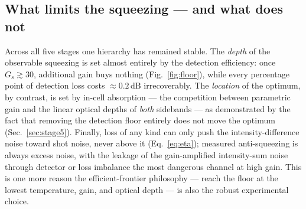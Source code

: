 \documentclass[11pt,a4paper]{article}
\newcommand{\dB}{\,\mathrm{dB}}
\begin{document}
\subsection{What limits the squeezing --- and what does not}
Across all five stages one hierarchy has remained stable. The \emph{depth} of
the observable squeezing is set almost entirely by the detection efficiency:
once $G_s\gtrsim 30$, additional gain buys nothing
(Fig.~\ref{fig:floor}), while every percentage point of detection loss
costs $\approx 0.2\dB$ irrecoverably. The \emph{location} of the optimum,
by contrast, is set by in-cell absorption --- the competition between
parametric gain and the linear optical depths of \emph{both} sidebands ---
as demonstrated by the fact that removing the detection floor entirely does
not move the optimum (Sec.~\ref{sec:stage5}). Finally, loss of any kind can
only push the intensity-difference noise toward shot noise, never above it
(Eq.~\eqref{eq:eta}); measured anti-squeezing is always excess noise, with
the leakage of the gain-amplified intensity-sum noise through detector or
loss imbalance the most dangerous channel at high gain. This is one more
reason the efficient-frontier philosophy --- reach the floor at the lowest
temperature, gain, and optical depth --- is also the robust experimental
choice.
\end{document}
